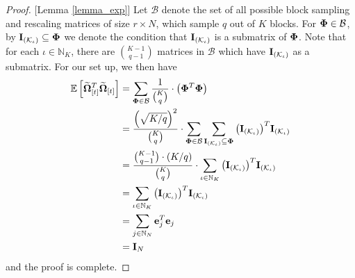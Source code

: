 \documentclass[journal,letterpaper,onecolumn,twoside,nofonttune]{IEEEtran}
\newcommand{\K}{\mathcal{K}}
\newcommand{\Omb}{\bold{\Omega}}
\newcommand{\Ombwt}{\widetilde{\Omb}}
\newcommand{\Phib}{\bold{\Phi}}
\newcommand{\E}{\mathbb{E}}
\newcommand{\N}{\mathbb{N}}
\newcommand{\Bcal}{\mathcal{B}}
\newcommand{\eb}{\bold{e}}
\newcommand{\Ib}{\bold{I}}
\begin{document}
\begin{proof}{[Lemma \ref{lemma_exp}]}
Let $\Bcal$ denote the set of all possible block sampling and rescaling matrices of size $r\times N$, which sample $q$ out of $K$ blocks. For $\Phib\in\Bcal$, by $\Ib_{(\K_\iota)}\subseteq\Phib$ we denote the condition that $\Ib_{(\K_\iota)}$ is a submatrix of $\Phib$. Note that for each $\iota\in\N_K$, there are ${K-1\choose q-1}$ matrices in $\Bcal$ which have $\Ib_{(\K_\iota)}$ as a submatrix. For our set up, we then have
\begin{align*}
  \E\left[\Ombwt_{[t]}^T\Ombwt_{[t]}\right] &= \sum_{\Phib\in\Bcal}\frac{1}{{K\choose q}}\cdot\left(\Phib^T\Phib\right)\\
  &= \frac{{\left(\sqrt{K/q}\right)^2}}{{K\choose q}}\cdot\sum_{\Phib\in\Bcal}\sum_{\Ib_{(\K_\iota)}\subseteq\Phib}\big(\Ib_{(\K_\iota)}\big)^T\Ib_{(\K_\iota)}\\
  &= \frac{{K-1\choose q-1}\cdot(K/q)}{{K\choose q}}\cdot\sum_{\iota\in\N_K}\big(\Ib_{(\K_\iota)}\big)^T\Ib_{(\K_\iota)}\\
  &= \sum_{\iota\in\N_K}\big(\Ib_{(\K_\iota)}\big)^T\Ib_{(\K_\iota)}\\
  &= \sum_{j\in\N_N}\eb_j^T\eb_j\\
  &= \Ib_N
\end{align*}
and the proof is complete.

\end{proof}
\end{document}
